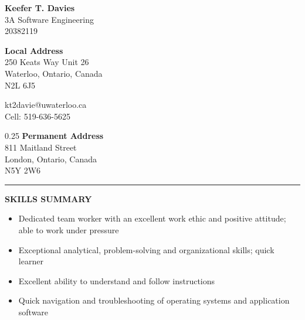 \documentclass[10pt,letterpaper]{article}
\newenvironment{indentedlist}[1]%
{\begin{list}{}%
	{\setlength{\leftmargin}{#1}}%
	\item[]%
}
{\end{list}}
\begin{document}
	\begin{center}
		{\Large \textbf{Keefer T. Davies}}\\		
		3A Software Engineering\\
		20382119
	\end{center}

	\begin{minipage}{0.30\columnwidth}
		\textbf{Local Address}\\
		250 Keats Way Unit 26\\		
		Waterloo, Ontario, Canada\\		
		N2L 6J5
		
	\end{minipage}
	\begin{minipage}{0.33\columnwidth}
		\begin{center}
			kt2davie@uwaterloo.ca\\			
			Cell: 519-636-5625
		\end{center}
	\end{minipage}
	\begin{minipage}{0.33\columnwidth}
		\begin{adjustwidth}{0.25\columnwidth}{}
			{\textbf{Permanent Address}}\\			
			811 Maitland Street\\			
			London, Ontario, Canada\\			
			N5Y 2W6
		\end{adjustwidth}
	\end{minipage}
	
	\vspace{1em}

	\hrule

	\vspace{1em}

	\textbf{SKILLS SUMMARY}
		\begin{indentedlist}{2em}
			\begin{itemize}
				\item Dedicated team worker with an excellent work ethic and positive attitude; able to work under pressure
				\item Exceptional analytical, problem-solving and organizational skills; quick learner
				\item Excellent ability to understand and follow instructions
				\item Quick navigation and troubleshooting of operating systems and application software
			\end{itemize}
		\end{indentedlist}
	
\end{document}
